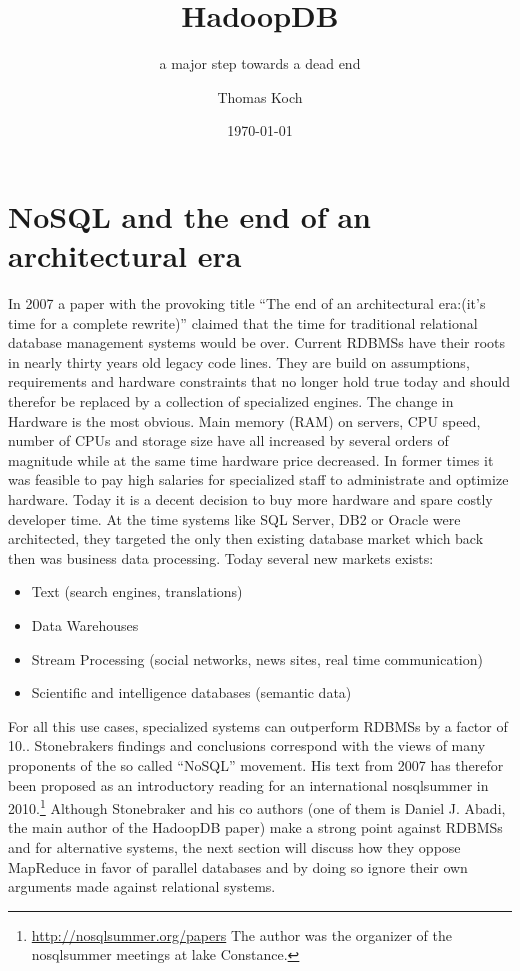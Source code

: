 \documentclass[12pt,a4paper]{scrartcl}		%
\begin{document}
\title{HadoopDB}
\subtitle{a major step towards a dead end}
\author{Thomas Koch}
\date{\today}
\maketitle{}

\begin{abstract}
  
\end{abstract}
\tableofcontents{}

\section{NoSQL and the end of an architectural era}
In 2007 a paper with the provoking title ``The end of an architectural era:(it's time for a complete rewrite)''\cite{sto07} claimed that the time for traditional relational database management systems would be over. Current RDBMSs have their roots in nearly thirty years old legacy code lines. They are build on assumptions, requirements and hardware constraints that no longer hold true today and should therefor be replaced by a collection of specialized engines.
The change in Hardware is the most obvious. Main memory (RAM) on servers, CPU speed, number of CPUs and storage size have all increased by several orders of magnitude while at the same time hardware price decreased. In former times it was feasible to pay high salaries for specialized staff to administrate and optimize hardware. Today it is a decent decision to buy more hardware and spare costly developer time.
At the time systems like SQL Server, DB2 or Oracle were architected, they targeted the only then existing database market which back then was business data processing. Today several new markets exists:
\begin{itemize}
\item Text (search engines, translations)
\item Data Warehouses
\item Stream Processing (social networks, news sites, real time communication)
\item Scientific and intelligence databases (semantic data)
\end{itemize}
For all this use cases, specialized systems can outperform RDBMSs by a factor of 10.\cite{conf/cidr/StonebrakerBCCGHHLRZ07}. Stonebrakers findings and conclusions correspond with the views of many proponents of the so called ``NoSQL'' movement. His text from 2007 has therefor been proposed as an introductory reading for an international nosqlsummer in 2010.\footnote{\url{http://nosqlsummer.org/papers} The author was the organizer of the nosqlsummer meetings at lake Constance.} 
Although Stonebraker and his co authors (one of them is Daniel J. Abadi, the main author of the HadoopDB paper) make a strong point against RDBMSs and for alternative systems, the next section will discuss how they oppose MapReduce in favor of parallel databases and by doing so ignore their own arguments made against relational systems.
\end{document}
